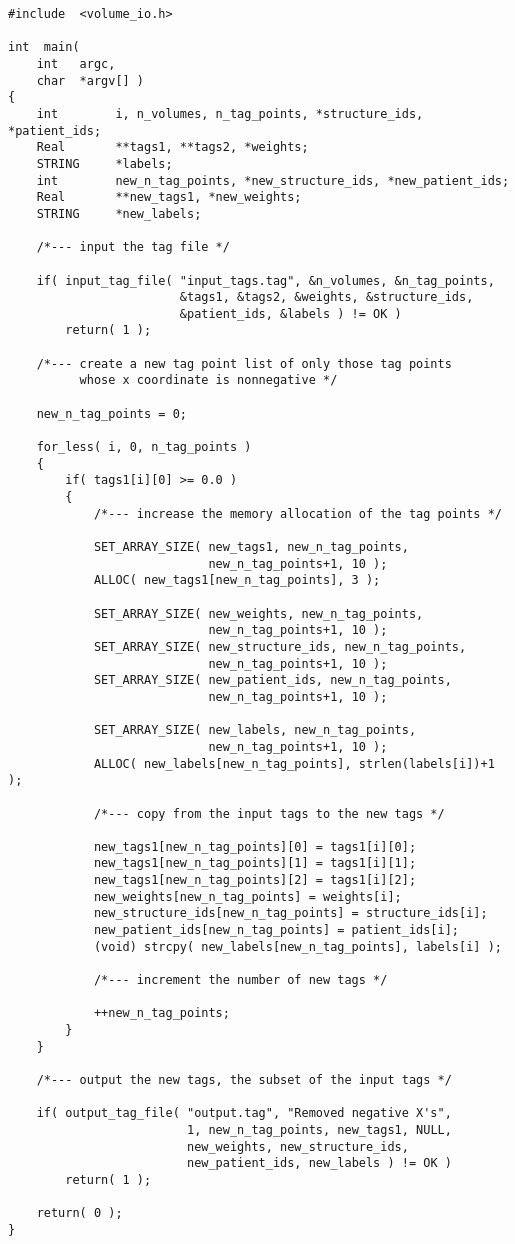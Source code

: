 {\small
\begin{verbatim}
#include  <volume_io.h>

int  main(
    int   argc,
    char  *argv[] )
{
    int        i, n_volumes, n_tag_points, *structure_ids, *patient_ids;
    Real       **tags1, **tags2, *weights;
    STRING     *labels;
    int        new_n_tag_points, *new_structure_ids, *new_patient_ids;
    Real       **new_tags1, *new_weights;
    STRING     *new_labels;

    /*--- input the tag file */

    if( input_tag_file( "input_tags.tag", &n_volumes, &n_tag_points,
                        &tags1, &tags2, &weights, &structure_ids,
                        &patient_ids, &labels ) != OK )
        return( 1 );

    /*--- create a new tag point list of only those tag points
          whose x coordinate is nonnegative */

    new_n_tag_points = 0;

    for_less( i, 0, n_tag_points )
    {
        if( tags1[i][0] >= 0.0 )
        {
            /*--- increase the memory allocation of the tag points */

            SET_ARRAY_SIZE( new_tags1, new_n_tag_points,
                            new_n_tag_points+1, 10 );
            ALLOC( new_tags1[new_n_tag_points], 3 );

            SET_ARRAY_SIZE( new_weights, new_n_tag_points,
                            new_n_tag_points+1, 10 );
            SET_ARRAY_SIZE( new_structure_ids, new_n_tag_points,
                            new_n_tag_points+1, 10 );
            SET_ARRAY_SIZE( new_patient_ids, new_n_tag_points,
                            new_n_tag_points+1, 10 );

            SET_ARRAY_SIZE( new_labels, new_n_tag_points,
                            new_n_tag_points+1, 10 );
            ALLOC( new_labels[new_n_tag_points], strlen(labels[i])+1 );

            /*--- copy from the input tags to the new tags */

            new_tags1[new_n_tag_points][0] = tags1[i][0];
            new_tags1[new_n_tag_points][1] = tags1[i][1];
            new_tags1[new_n_tag_points][2] = tags1[i][2];
            new_weights[new_n_tag_points] = weights[i];
            new_structure_ids[new_n_tag_points] = structure_ids[i];
            new_patient_ids[new_n_tag_points] = patient_ids[i];
            (void) strcpy( new_labels[new_n_tag_points], labels[i] );

            /*--- increment the number of new tags */

            ++new_n_tag_points;
        }
    }

    /*--- output the new tags, the subset of the input tags */

    if( output_tag_file( "output.tag", "Removed negative X's",
                         1, new_n_tag_points, new_tags1, NULL,
                         new_weights, new_structure_ids,
                         new_patient_ids, new_labels ) != OK )
        return( 1 );

    return( 0 );
}
\end{verbatim}
}

